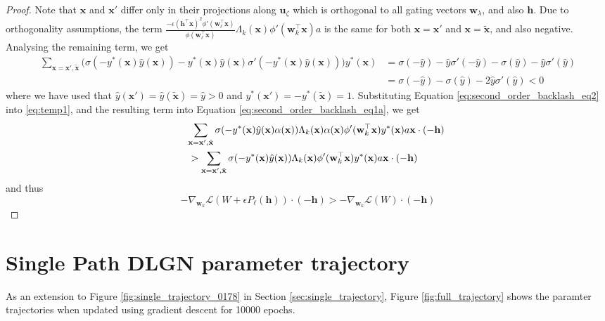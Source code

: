 \documentclass{article}
\theoremstyle{plain}
\theoremstyle{definition}
\theoremstyle{remark}
\newcommand{\1}{{\mathbf 1}}
\newcommand{\0}{{\mathbf 0}}
\newcommand{\h}{{\mathbf h}}
\newcommand{\w}{{\mathbf w}}
\newcommand{\x}{{\mathbf x}}
\newcommand{\bu}{{\mathbf u}}
\renewcommand{\>}{{\rightarrow}}
\begin{document}
\begin{proof}
Note that $\x$ and $\x'$ differ only in their projections along $\bu_\zeta$ which is orthogonal to all gating vectors $\w_\lambda$, and also $\h$. Due to orthogonality assumptions, the term $\frac{ -\epsilon(\h^\top\x)^2 \phi'(\w_\ell^\top \x)}{\phi(\w_\ell^\top \x)}\Lambda_k(\x) \phi'(\w_k^\top \x) a$ is the same for both $\x=\x'$ and $\x=\tilde \x$, and also negative. Analysing the remaining term, we get
\begin{align}
\sum_{\x=\x',\tilde\x}  \Big( \sigma(-y^*(\x) \hat y(\x))-y^*(\x)\hat y(\x) \sigma'(-y^*(\x) \hat y(\x)) \Big) y^*(\x)
&=
\sigma(-\hat y) - \hat y \sigma'(-\hat y) - \sigma(\hat y) - \hat y \sigma'(\hat y) \nonumber \\
&=  \sigma(-\hat y) - \sigma(\hat y) - 2 \hat y \sigma'(\hat y) < 0\label{eq:second_order_backlash_eq2}  
\end{align}
where we have used that $\hat y(\x') = \hat y (\tilde \x) = \hat y > 0$ and $y^*(\x') = - y^*(\tilde \x) = 1$.
Substituting Equation \ref{eq:second_order_backlash_eq2} into \ref{eq:temp1}, and the resulting term into Equation \ref{eq:second_order_backlash_eq1a}, we get
\begin{align}
\lefteqn{\sum_{\x=\x',\tilde\x} \sigma (-y^*(\x) \hat y(\x)\alpha(\x)) \Lambda_k(\x) \alpha(\x) \phi'(\w_k^\top \x) y^*(\x) a \x \cdot (-\h)} \nonumber \\ 
&>
\sum_{\x=\x',\tilde\x} \sigma (-y^*(\x) \hat y(\x)) \Lambda_k(\x) \phi'(\w_k^\top \x) y^*(\x)a \x \cdot (-\h)  \nonumber
\end{align}
and thus
\[
-\nabla_{\w_k} \mathcal{L}(W + \epsilon P_\ell(\h)) \cdot (-\h) 
>
-\nabla_{\w_k} \mathcal{L}(W) \cdot (-\h) 
\]
\end{proof}



\section{Single Path DLGN parameter trajectory}
As an extension to Figure \ref{fig:single_trajectory_0178} in Section \ref{sec:single_trajectory}, Figure \ref{fig:full_trajectory} shows the paramter trajectories when updated using gradient descent for 10000 epochs.

\end{document}
